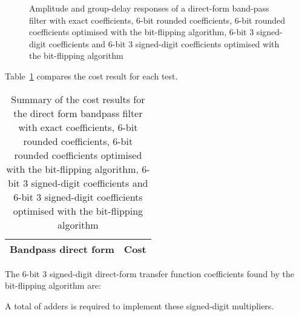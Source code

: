 \documentclass[a4paper,twoside,10pt,english]{report}
\begin{document}
\begin{figure}[!htbp]
\begin{center}
\scalebox{0.7}{}
\caption{Amplitude and group-delay responses of a direct-form band-pass filter
with exact coefficients, 6-bit rounded coefficients, 6-bit rounded coefficients
optimised with the bit-flipping algorithm, 6-bit 3 signed-digit coefficients and
6-bit 3 signed-digit coefficients optimised with the bit-flipping algorithm}
\label{fig:bitflip-bandpass-direct-response}
\end{center}
\end{figure}

Table~\ref{tab:bitflip-bandpass-direct-cost-summary} compares the cost
result for each test.

\begin{table}[htb]
\centering
\begin{threeparttable}
\begin{tabular}{lr}  \\ \toprule
Bandpass direct form & Cost \\ \midrule

\bottomrule
\end{tabular}
\end{threeparttable}
\caption[Summary of cost results for the direct form bandpass 
filter bit-flipping algorithm example]
{Summary of the cost results for the 
direct form bandpass filter with exact coefficients, 6-bit rounded 
coefficients, 6-bit rounded coefficients optimised with the bit-flipping 
algorithm, 6-bit 3 signed-digit coefficients and 6-bit 3 signed-digit 
coefficients optimised with the bit-flipping algorithm}
\label{tab:bitflip-bandpass-direct-cost-summary}
\end{table}

The 6-bit 3 signed-digit direct-form transfer function coefficients found by the 
bit-flipping algorithm are:
\begin{small}


\end{small}

A total of adders is
required to implement these signed-digit multipliers.
\end{document}
